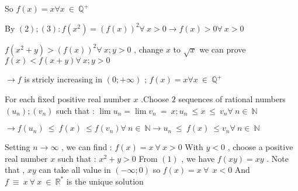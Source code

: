 \begin{solution}
\begin{italicized}
    So $ f(x) = x \forall x \ \in \ \mathbb{Q^{ + }}$

   By $ (2) ; (3) : f(x^2) = (f(x))^2 \forall \ x > 0 \longrightarrow f(x) > 0 \forall \ x > 0$

   $ f(x^2 + y) > (f(x))^2 \forall \ x;y > 0$ , change $ x$ to $ \sqrt {x}$  we can prove $ f(x) < f(x + y) \forall \ x;y > 0$
 
$ \longrightarrow f$ is stricly increasing in $ (0; + \infty)$ ; $ f(x) = x \forall x \ \in \ \mathbb{Q^{ + }}$
          
For each  fixed positive real number $ x$ .Choose $ 2$ sequences of rational numbers $ (u_n) ; (v_n)$ such that :
               $ \lim u_n = \lim v_n \ = \ x ; u_n \ \leq x \ \leq \ v_n \forall \ n \in \ \mathbb{N}$
 
$ \longrightarrow f(u_n) \ \leq \ f(x) \ \leq f(v_n) \forall \ n \in \ \mathbb{N} \longrightarrow u_n \ \leq \ f(x) \ \leq v_n \forall \ n \in \ \mathbb{N}$

Setting $ n \to \infty$ , we can find : $ f(x) = x \ \forall \ x > 0$
         With $ y < 0$ , choose a positive real number $ x$ such that : $ x^2 + y > 0$
From $ (1)$ , we have $ f(xy) = xy$ . Note that , $ xy$ can take all value in $ ( - \infty ; 0)$
so   $ f(x) = x \ \forall \ \ x < 0$   And $ f \ \equiv \ x \ \forall \ x \ \in \ \mathbb{R^{*}}$ is the unique solution   


     \end{italicized}
\end{solution}



